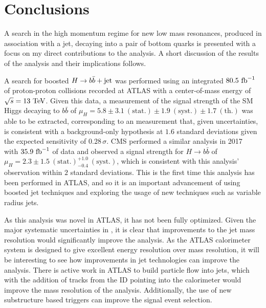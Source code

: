 \chapter{Conclusions}\label{chapter:conclusions}

A search in the high momentum regime for new low mass resonances, produced in association with a jet, decaying into a pair of bottom quarks is presented with a focus on my direct contributions to the analysis.
A short discussion of the results of the analysis and their implications follows.

A search for boosted $H \to b\bar{b}{} +\mathrm{jet}$ was performed using an integrated $80.5~\mathrm{fb}^{-1}$ of proton-proton collisions recorded at ATLAS with a center-of-mass energy of $\sqrt{s} = 13~\mathrm{TeV}$.
Given this data, a measurement of the signal strength of the SM Higgs decaying to $b\bar{b}$ of ${\mu_{H} = 5.8 \pm 3.1~\mathrm{(stat.)} \pm 1.9~\mathrm{(syst.)} \pm 1.7~\mathrm{(th.)}}$ was able to be extracted, corresponding to an measurement that, given uncertainties, is consistent with a background-only hypothesis at $1.6$ standard deviations given the expected sensitivity of $0.28\,\sigma$.
CMS performed a similar analysis in 2017~\cite{CMS:2017cbv} with $35.9~\mathrm{fb}^{-1}$ of data and observed a signal strength for $H\to b\bar{b}$ of ${\mu_{H} = 2.3\pm 1.5~\mathrm{(stat.)}_{-0.4}^{+1.0}}~\mathrm{(syst.)}$, which is consistent with this analysis' observation within $2$ standard deviations.
This is the first time this analysis has been performed in ATLAS, and so it is an important advancement of using boosted jet techniques and exploring the usage of new techniques such as variable radius jets.

As this analysis was novel in ATLAS, it has not been fully optimized.
Given the major systematic uncertainties in , it is clear that improvements to the jet mass resolution would significantly improve the analysis.
As the ATLAS calorimeter system is designed to give excellent energy resolution over mass resolution, it will be interesting to see how improvements in jet technologies can improve the analysis.
There is active work in ATLAS to build particle flow into \largeR{} jets, which with the addition of tracks from the ID pointing into the calorimeter would improve the mass resolution of the analysis.
Additionally, the use of new substructure based triggers can improve the signal event selection.

